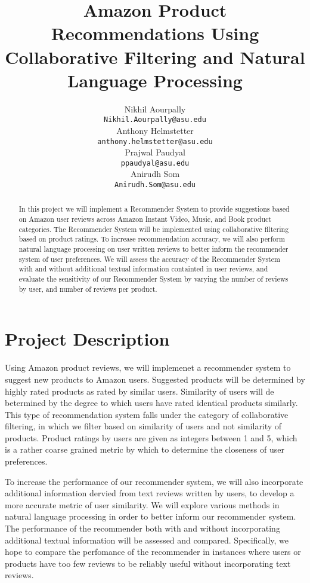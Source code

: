 \documentclass{article} %
\title{Amazon Product Recommendations Using Collaborative Filtering and Natural Language Processing  }
\author{
Nikhil Aourpally \\
\texttt{Nikhil.Aourpally@asu.edu} \\
\And
Anthony Helmstetter \\
\texttt{anthony.helmstetter@asu.edu} \\
\And
Prajwal Paudyal \\
\texttt{ppaudyal@asu.edu} \\
\And
Anirudh Som \\
\texttt{Anirudh.Som@asu.edu} \\
}
\begin{document}
\maketitle

\begin{abstract}
In this project we will implement a Recommender System to provide suggestions based on Amazon user reviews across Amazon Instant Video, Music, and Book product categories. The Recommender System will be implemented using collaborative filtering based on product ratings. To increase recommendation accuracy, we will also perform natural language processing on user written reviews to better inform the recommender system of user preferences. We will assess the accuracy of the Recommender System with and without additional textual information containted in user reviews, and evaluate the sensitivity of our Recommender System by varying the number of reviews by user, and number of reviews per product. 
\end{abstract}

\section{Project Description}
Using Amazon product reviews, we will implemenet a recommender system to suggest new products to Amazon users. Suggested products will be determined by highly rated products as rated by similar users. Similarity of users will de betermined by the degree to which users have rated identical products similarly. This type of recommendation system falls under the category of collaborative filtering, in which we filter based on similarity of users and not similarity of products. Product ratings by users are given as integers between 1 and 5, which is a rather coarse grained metric by which to determine the closeness of user preferences. 

To increase the performance of our recommender system, we will also incorporate additional information dervied from text reviews written by users, to develop a more accurate metric of user similarity. We will explore various methods in natural language processing in order to better inform our recommender system. The performance of the recommender both with and without incorporating additional textual information will be assessed and compared. Specifically, we hope to compare the perfomance of the recommender in instances where users or products have too few reviews to be reliably useful without incorporating text reviews.  
\end{document}
